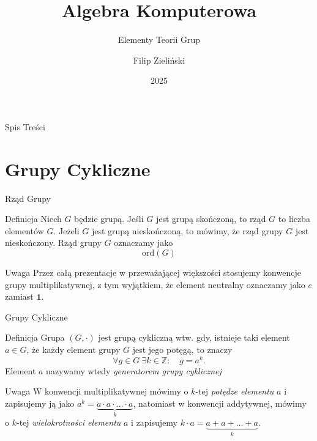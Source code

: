 \documentclass{beamer}
\title{Algebra Komputerowa}
\subtitle{Elementy Teorii Grup \cite{Gleichgewicht}}
\author{Filip Zieli\'nski}
\date{2025}
\newcommand{\one}{\mathbf{1}}
\newcommand{\ord}{\textrm{ord}}
\begin{document}
\begin{frame}
    \titlepage
\end{frame}
 
\begin{frame}{Spis Treści}
    \tableofcontents
\end{frame}

\section{Grupy Cykliczne}

\begin{frame}{Rząd Grupy}
    \begin{block}{Definicja}
        Niech $G$ będzie grupą. Jeśli $G$ jest grupą skończoną, to rząd $G$ to liczba elementów $G$.
        Jeżeli $G$ jest grupą nieskończoną, to mówimy, że rząd grupy $G$ jest nieskończony. Rząd grupy $G$ oznaczamy jako
        $$\ord(G)$$
    \end{block}
    \pause 
    \begin{alertblock}{Uwaga}
        Przez całą prezentacje w przeważającej większości stosujemy konwencje grupy multiplikatywnej, z tym wyjątkiem, że element neutralny oznaczamy jako $e$ zamiast $\one$.
    \end{alertblock}
\end{frame}

\begin{frame}{Grupy Cykliczne}
    \begin{block}{Definicja}
        Grupa $(G,\cdot)$ jest \alert{grupą cykliczną} wtw. gdy, istnieje taki element $a \in G$, że każdy element grupy $G$
        jest jego potęgą, to znaczy
        $$\forall g \in G \ \exists k \in \mathbb{Z}  : \quad g = a^k .$$
        Element $a$ nazywamy wtedy \textit{generatorem grupy cyklicznej}
    \end{block}
    \begin{alertblock}{Uwaga}
        W konwencji multiplikatywnej mówimy o $k$-tej \textit{potędze elementu} $a$ i zapisujemy ją jako
        $a^k = \underbrace{a \cdot a \cdot \ldots \cdot a}_{k}$, natomiast w konwencji addytywnej, mówimy o
        $k$-tej \textit{wielokrotności elementu} $a$ i zapisujemy $k \cdot a = \underbrace{a + a + \ldots + a}_{k}$.
    \end{alertblock}

\end{frame}
\end{document}
